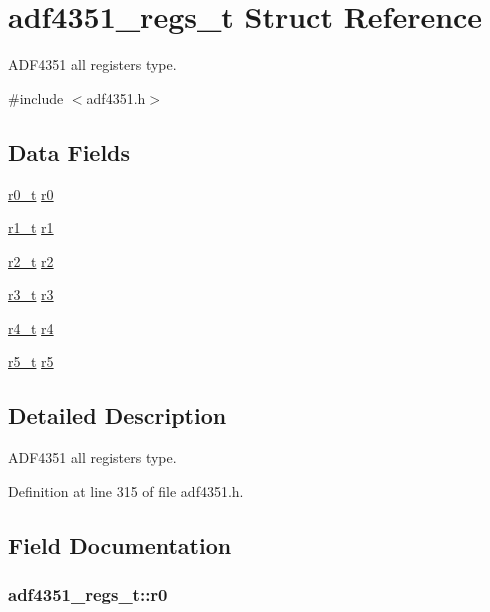 \hypertarget{structadf4351__regs__t}{}\section{adf4351\+\_\+regs\+\_\+t Struct Reference}
\label{structadf4351__regs__t}


A\+D\+F4351 all registers type.  




{\ttfamily \#include $<$adf4351.\+h$>$}

\subsection*{Data Fields}
\begin{DoxyCompactItemize}
\item 
\hyperlink{structr0__t}{r0\+\_\+t} \hyperlink{structadf4351__regs__t_af58eb2d998c67713353ba39c89c9b4b2}{r0}
\item 
\hyperlink{structr1__t}{r1\+\_\+t} \hyperlink{structadf4351__regs__t_a9e35aa252797cdae6d46ae0daad2bc40}{r1}
\item 
\hyperlink{structr2__t}{r2\+\_\+t} \hyperlink{structadf4351__regs__t_af6667dbbd7434e0394cc9f569d3e24bb}{r2}
\item 
\hyperlink{structr3__t}{r3\+\_\+t} \hyperlink{structadf4351__regs__t_a1aa968491b1182f3ae4f426ef5c1b83a}{r3}
\item 
\hyperlink{structr4__t}{r4\+\_\+t} \hyperlink{structadf4351__regs__t_a343af9ab05747dd9b977603d02ebb4df}{r4}
\item 
\hyperlink{structr5__t}{r5\+\_\+t} \hyperlink{structadf4351__regs__t_ab0bd52a2f47aa3f45d0aa97136ec6e8c}{r5}
\end{DoxyCompactItemize}


\subsection{Detailed Description}
A\+D\+F4351 all registers type. 

Definition at line 315 of file adf4351.\+h.



\subsection{Field Documentation}
\subsubsection[{\texorpdfstring{r0}{r0}}]{ adf4351\+\_\+regs\+\_\+t\+::r0}\hypertarget{structadf4351__regs__t_af58eb2d998c67713353ba39c89c9b4b2}{}\label{structadf4351__regs__t_af58eb2d998c67713353ba39c89c9b4b2}


